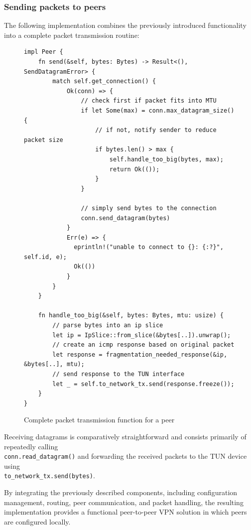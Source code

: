 \documentclass[a4paper, 10pt]{article}
\begin{document}
\newpage

\subsubsection{Sending packets to peers}

The following implementation combines the previously introduced functionality into a complete packet transmission routine:
\begin{figure}[H]
  \begin{verbatim}
impl Peer {
    fn send(&self, bytes: Bytes) -> Result<(), SendDatagramError> {
        match self.get_connection() {
            Ok(conn) => {
                // check first if packet fits into MTU
                if let Some(max) = conn.max_datagram_size() {
                    // if not, notify sender to reduce packet size
                    if bytes.len() > max {
                        self.handle_too_big(bytes, max);
                        return Ok(());
                    }
                }

                // simply send bytes to the connection
                conn.send_datagram(bytes)
            }
            Err(e) => {
              eprintln!("unable to connect to {}: {:?}", self.id, e);
              Ok(())
            }
        }
    }

    fn handle_too_big(&self, bytes: Bytes, mtu: usize) {
        // parse bytes into an ip slice
        let ip = IpSlice::from_slice(&bytes[..]).unwrap();
        // create an icmp response based on original packet
        let response = fragmentation_needed_response(&ip, &bytes[..], mtu);
        // send response to the TUN interface
        let _ = self.to_network_tx.send(response.freeze());
    }
}
  \end{verbatim}
  \caption{Complete packet transmission function for a peer}
\end{figure}

Receiving datagrams is comparatively straightforward and consists primarily of repeatedly calling \\ \texttt{conn.read\_datagram()}
and forwarding the received packets to the TUN device using \\ \texttt{to\_network\_tx.send(bytes)}.

By integrating the previously described components, including configuration management,
routing, peer communication, and packet handling, the resulting implementation provides
a functional peer-to-peer VPN solution in which peers are configured locally.
\end{document}
